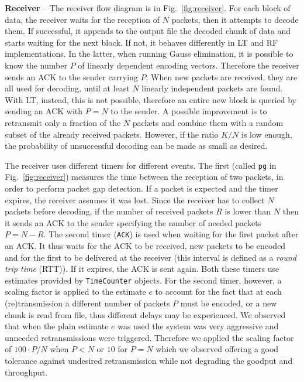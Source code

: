 \textbf{Receiver} -- The receiver flow diagram is in Fig.~\ref{fig:receiver}. 
For each block of data, the receiver waits for the reception of $N$ packets, then it attempts to decode them. If successful, it appends to the output file the decoded chunk of data and starts waiting for the next block. If not, it behaves differently in LT and RF implementations. In the latter, when running Gauss elimination, it is possible to know the number $P$ of linearly dependent encoding vectors. Therefore the receiver sends an ACK to the sender carrying $P$. When new packets are received, they are all used for decoding, until at least $N$ %
linearly independent packets are found.
With LT, instead, this is not possible, therefore an entire new block is queried by sending an ACK with $P=N$ to the sender. A possible improvement is to retransmit only a fraction of the $N$ packets and combine them with a random subset of the already received packets. However, if the ratio $K/N$ is low enough, the probability of unsuccessful decoding can be made as small as desired. 

The receiver uses different timers for different events. The first (called \texttt{pg} in Fig.~\ref{fig:receiver}) measures the time between the reception of two packets, in order to perform packet gap detection. If a packet is expected and the timer expires, the receiver assumes it was lost. Since the receiver has to collect $N$ packets before decoding, if the number of received packets $R$ is lower than $N$ then it sends an ACK to the sender specifying the number of needed packets $P = N - R$. The second timer (\texttt{ACK}) is used when waiting for the first packet after an ACK. It thus waits for the ACK to be received, new packets to be encoded and for the first to be delivered at the receiver (this interval is defined as a \textit{round trip time} (RTT)). If it expires, the ACK is sent again. Both these timers use estimates provided by \texttt{TimeCounter} objects. For the second timer, however, a scaling factor is applied to the estimate $e$ to account for the fact that at each (re)transmission a different number of packets $P$ must be encoded, or a new chunk is read from file, thus different delays may be experienced. We observed that when the plain estimate $e$ was used the system was very aggressive and unneeded retransmissions were triggered. Therefore we applied the scaling factor of $100 \cdot P / N$ when $P < N$ or $10$ for $P = N$ which we observed offering a good tolerance against undesired retransmission while not degrading the goodput and throughput.

